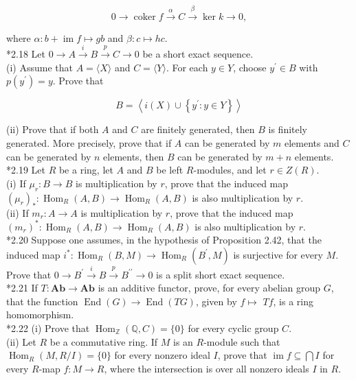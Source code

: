 \documentclass[10pt]{article}
\begin{document}
$$
0 \rightarrow \operatorname{coker} f \xrightarrow{\alpha} C \xrightarrow{\beta} \operatorname{ker} k \rightarrow 0,
$$

where $\alpha: b+\operatorname{im} f \mapsto g b$ and $\beta: c \mapsto h c$.\\
*2.18 Let $0 \rightarrow A \xrightarrow{i} B \xrightarrow{p} C \rightarrow 0$ be a short exact sequence.\\
(i) Assume that $A=\langle X\rangle$ and $C=\langle Y\rangle$. For each $y \in Y$, choose $y^{\prime} \in B$ with $p\left(y^{\prime}\right)=y$. Prove that

$$
B=\left\langle i(X) \cup\left\{y^{\prime}: y \in Y\right\}\right\rangle
$$

(ii) Prove that if both $A$ and $C$ are finitely generated, then $B$ is finitely generated. More precisely, prove that if $A$ can be generated by $m$ elements and $C$ can be generated by $n$ elements, then $B$ can be generated by $m+n$ elements.\\
*2.19 Let $R$ be a ring, let $A$ and $B$ be left $R$-modules, and let $r \in Z(R)$.\\
(i) If $\mu_{r}: B \rightarrow B$ is multiplication by $r$, prove that the induced map $\left(\mu_{r}\right)_{*}: \operatorname{Hom}_{R}(A, B) \rightarrow \operatorname{Hom}_{R}(A, B)$ is also multiplication by $r$.\\
(ii) If $m_{r}: A \rightarrow A$ is multiplication by $r$, prove that the induced map $\left(m_{r}\right)^{*}: \operatorname{Hom}_{R}(A, B) \rightarrow \operatorname{Hom}_{R}(A, B)$ is also multiplication by $r$.\\
*2.20 Suppose one assumes, in the hypothesis of Proposition 2.42, that the induced map $i^{*}: \operatorname{Hom}_{R}(B, M) \rightarrow \operatorname{Hom}_{R}\left(B^{\prime}, M\right)$ is surjective for every $M$. Prove that $0 \rightarrow B^{\prime} \xrightarrow{i} B \xrightarrow{p} B^{\prime \prime} \rightarrow 0$ is a split short exact sequence.\\
*2.21 If $T: \mathbf{A b} \rightarrow \mathbf{A b}$ is an additive functor, prove, for every abelian group $G$, that the function $\operatorname{End}(G) \rightarrow \operatorname{End}(T G)$, given by $f \mapsto$ $T f$, is a ring homomorphism.\\
*2.22 (i) Prove that $\operatorname{Hom}_{\mathbb{Z}}(\mathbb{Q}, C)=\{0\}$ for every cyclic group $C$.\\
(ii) Let $R$ be a commutative ring. If $M$ is an $R$-module such that $\operatorname{Hom}_{R}(M, R / I)=\{0\}$ for every nonzero ideal $I$, prove that $\operatorname{im} f \subseteq \bigcap I$ for every $R$-map $f: M \rightarrow R$, where the intersection is over all nonzero ideals $I$ in $R$.\\
\end{document}
